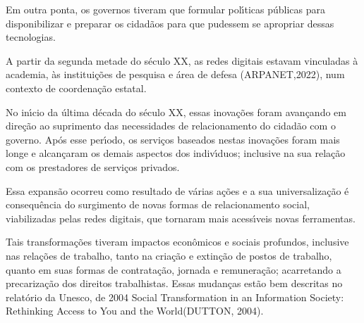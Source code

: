 \documentclass[
12pt,		%
openright,	%
twoside,  %
a4paper,			%
chapter=TITLE,		%
english,			%
french,				%
spanish,			%
brazil				%
]{USPSC-classe/USPSC}
\begin{document}
Em outra ponta, os governos tiveram que formular pol\'{\i}ticas p\'ublicas para disponibilizar e preparar os cidad\~aos para que pudessem se apropriar dessas tecnologias.









A partir da segunda metade do s\'eculo XX, as redes digitais estavam vinculadas \`a academia, \`as institui\c{c}\~oes de pesquisa e \'area de defesa (ARPANET,2022), num contexto de coordena\c{c}\~ao estatal.









No in\'{\i}cio da \'ultima d\'ecada do s\'eculo XX, essas inova\c{c}\~oes  foram avan\c{c}ando em dire\c{c}\~ao ao suprimento das necessidades de relacionamento do cidad\~ao com o governo. Ap\'os esse per\'{\i}odo, os servi\c{c}os baseados nestas inova\c{c}\~oes foram mais longe e alcan\c{c}aram  os demais aspectos dos indiv\'{\i}duos; inclusive na sua rela\c{c}\~ao com os prestadores de servi\c{c}os privados.









Essa expans\~ao ocorreu como resultado de v\'arias a\c{c}\~oes e a sua universaliza\c{c}\~ao \'e consequ\^encia do surgimento de novas formas de relacionamento social, viabilizadas pelas redes digitais, que tornaram mais acess\'{\i}veis novas ferramentas.









Tais transforma\c{c}\~oes tiveram impactos econ\^omicos e sociais profundos, inclusive nas rela\c{c}\~oes de trabalho, tanto na cria\c{c}\~ao e extin\c{c}\~ao de postos de trabalho,  quanto em suas formas de contrata\c{c}\~ao, jornada e remunera\c{c}\~ao; acarretando a precariza\c{c}\~ao dos direitos trabalhistas. Essas mudan\c{c}as est\~ao bem descritas  no relat\'orio da Unesco,  de 2004 \textquotedbl Social Transformation in an Information Society: Rethinking Access to You and the World\textquotedbl  (DUTTON, 2004).
\end{document}
